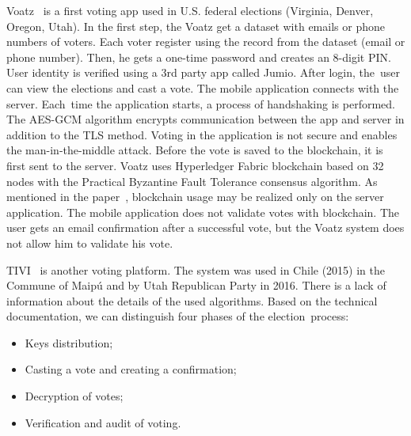 \documentclass[applsci,article,accept,moreauthors,pdftex]{Definitions/mdpi}
\begin{document}
Voatz~\cite{moore2019under} is a first voting app used in U.S. federal elections (Virginia, Denver, Oregon, Utah). In the first step, the Voatz get a dataset with emails or phone numbers of voters. Each voter register using the record from the dataset (email or phone number). Then, he gets a one-time password and creates an 8-digit PIN. User identity is verified using a 3rd party app called Jumio. After login, the~user can view the elections and cast a vote. The mobile application connects with the server. Each~time the application starts, a process of handshaking is performed. The AES-GCM algorithm encrypts communication between the app and server in addition to the TLS method. Voting in the application is not secure and enables the man-in-the-middle attack. Before the vote is saved to the blockchain, it is first sent to the server. Voatz uses Hyperledger Fabric blockchain based on 32 nodes with the Practical Byzantine Fault Tolerance consensus algorithm. As mentioned in the paper~\cite{voatz:specter2020ballot}, blockchain usage may be realized only on the server application. The mobile application does not validate votes with blockchain. The user gets an email confirmation after a successful vote, but the Voatz system does not allow him to validate his vote. 

TIVI~\cite{tivi:online} is another voting platform. The system was used in Chile (2015) in the Commune of Maipú and by Utah Republican Party in 2016. There is a lack of information about the details of the used algorithms. Based on the technical documentation, we can distinguish four phases of the election~process:
\begin{itemize}
    \item Keys distribution;
    \item Casting a vote and creating a confirmation;
    \item Decryption of votes;
    \item Verification and audit of voting.
\end{itemize}
\end{document}
